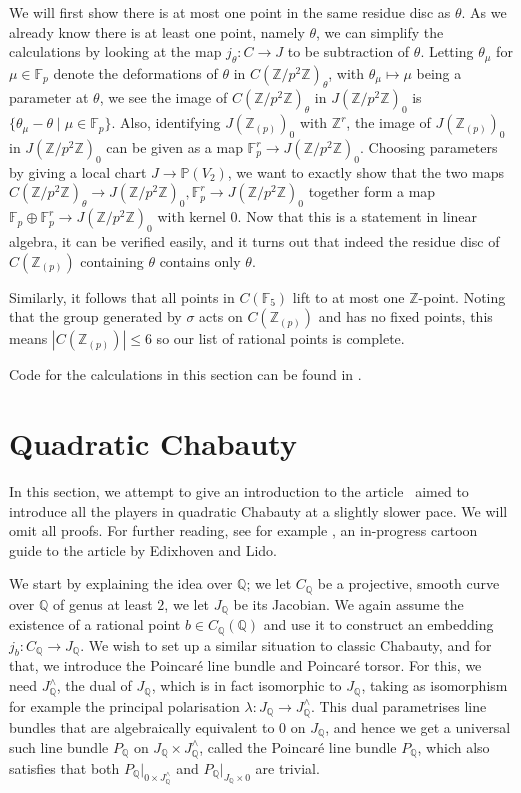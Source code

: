 \documentclass[12pt]{article}
\newcommand{\Z}{\mathbb{Z}}
\newcommand{\Q}{\mathbb{Q}}
\renewcommand{\P}{\mathbb{P}}
\newcommand{\F}{\mathbb{F}}
\theoremstyle{plain}
\theoremstyle{definition}
\theoremstyle{remark}
\begin{document}
We will first show there is at most one point in the same residue disc as $\theta$. As we already know there is at least one point, namely $\theta$, we can simplify the calculations by looking at the map $j_{\theta}: C \to J$ to be subtraction of $\theta$. Letting $\theta_{\mu}$ for $\mu \in \F_p$ denote the deformations of $\theta$ in $C(\Z/p^2\Z)_{\theta}$, with $\theta_\mu \mapsto \mu$ being a parameter at $\theta$, we see the image of $C(\Z/p^2\Z)_\theta$ in $J(\Z/p^2\Z)_0$ is $\{\theta_\mu - \theta \mid \mu \in \F_p\}$. Also, identifying $J(\Z_{(p)})_0$ with $\Z^r$, the image of $J(\Z_{(p)})_0$ in $J(\Z/p^2\Z)_0$ can be given as a map $\F_p^r \to J(\Z/p^2\Z)_0$. Choosing parameters by giving a local chart $J \to \P(V_2)$, we want to exactly show that the two maps $C(\Z/p^2\Z)_\theta \to J(\Z/p^2\Z)_0, \F_p^r \to J(\Z/p^2\Z)_0$ together form a map $\F_p \oplus \F_p^r \to J(\Z/p^2\Z)_0$ with kernel $0$. Now that this is a statement in linear algebra, it can be verified easily, and it turns out that indeed the residue disc of $C(\Z_{(p)})$ containing $\theta$ contains only $\theta$.

Similarly, it follows that all points in $C(\F_5)$ lift to at most one $\Z$-point. Noting that the group generated by $\sigma$ acts on $C(\Z_{(p)})$ and has no fixed points, this means $|C(\Z_{(p)})| \leq 6$ so our list of rational points is complete.

Code for the calculations in this section can be found in \cite{spelier2020}.

\section{Quadratic Chabauty}
\label{section:quadratic}
In this section, we attempt to give an introduction to the article~\cite{edixhoven20} aimed to introduce all the players in quadratic Chabauty at a slightly slower pace. We will omit all proofs. For further reading, see for example \cite{hashimoto20}, an in-progress cartoon guide to the article by Edixhoven and Lido.

We start by explaining the idea over $\Q$; we let $C_\Q$ be a projective, smooth curve over $\Q$ of genus at least $2$, we let $J_\Q$ be its Jacobian. We again assume the existence of a rational point $b \in C_\Q(\Q)$ and use it to construct an embedding $j_b : C_\Q \to J_\Q$. We wish to set up a similar situation to classic Chabauty, and for that, we introduce the Poincar\'e line bundle and Poincar\'e torsor. For this, we need $J_\Q^\wedge$, the dual of $J_\Q$, which is in fact isomorphic to $J_\Q$, taking as isomorphism for example the principal polarisation $\lambda: J_\Q \to J_\Q^\wedge$. This dual parametrises line bundles that are algebraically equivalent to $0$ on $J_\Q$, and hence we get a universal such line bundle $P_\Q$ on $J_\Q \times J_\Q^\wedge$, called the Poincar\'e line bundle $P_\Q$, which also satisfies that both $P_{\Q}|_{0\times J_\Q^\wedge}$ and $P_{\Q}|_{J_\Q \times 0}$ are trivial.
\end{document}
